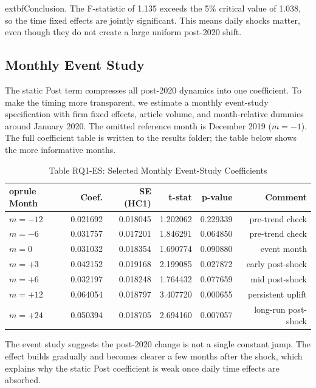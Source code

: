 \documentclass[11pt]{article}
\begin{document}
	extbf{Conclusion.} The F-statistic of 1.135 exceeds the 5\% critical value of 1.038, so the time fixed effects are jointly significant. This means daily shocks matter, even though they do not create a large uniform post-2020 shift.

\subsection*{Monthly Event Study}
The static Post term compresses all post-2020 dynamics into one coefficient. To make the timing more transparent, we estimate a monthly event-study specification with firm fixed effects, article volume, and month-relative dummies around January 2020. The omitted reference month is December 2019 ($m=-1$). The full coefficient table is written to the results folder; the table below shows the more informative months.

\begin{table}[H]
\centering
\caption*{Table RQ1-ES: Selected Monthly Event-Study Coefficients}
\begin{tabular}{lrrrrr}
	oprule
Month & Coef. & SE (HC1) & t-stat & p-value & Comment \\
\midrule
$m=-12$ & 0.021692 & 0.018045 & 1.202062 & 0.229339 & pre-trend check \\
$m=-6$ & 0.031757 & 0.017201 & 1.846291 & 0.064850 & pre-trend check \\
$m=0$ & 0.031032 & 0.018354 & 1.690774 & 0.090880 & event month \\
$m=+3$ & 0.042152 & 0.019168 & 2.199085 & 0.027872 & early post-shock \\
$m=+6$ & 0.032197 & 0.018248 & 1.764432 & 0.077659 & mid post-shock \\
$m=+12$ & 0.064054 & 0.018797 & 3.407720 & 0.000655 & persistent uplift \\
$m=+24$ & 0.050394 & 0.018705 & 2.694160 & 0.007057 & long-run post-shock \\
\bottomrule
\end{tabular}
\end{table}

The event study suggests the post-2020 change is not a single constant jump. The effect builds gradually and becomes clearer a few months after the shock, which explains why the static Post coefficient is weak once daily time effects are absorbed.
\end{document}
